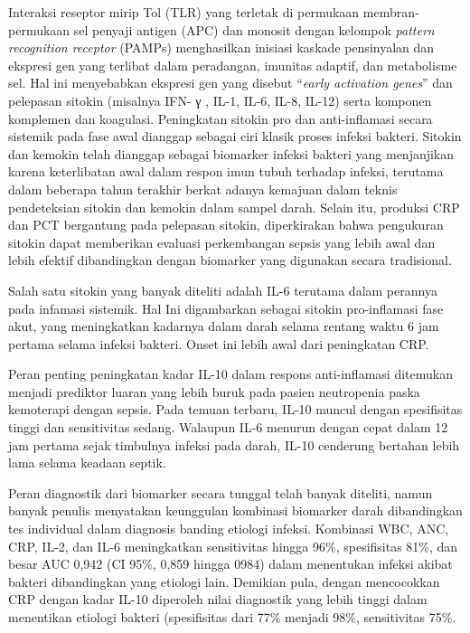 \documentclass[
  10pt,
  letterpaper,
]{article}
\begin{document}
Interaksi reseptor mirip Tol (TLR) yang terletak di permukaan membran­
permukaan sel penyaji antigen (APC) dan monosit dengan kelompok
\emph{pattern recognition receptor} (PAMPs) menghasilkan inisiasi
kaskade pensinyalan dan ekspresi gen yang terlibat dalam peradangan,
imunitas adaptif, dan metabolisme sel. Hal ini menyebabkan ekspresi gen
yang disebut ``\emph{early activation genes}'' dan pelepasan sitokin
(misalnya IFN- γ , IL-1, IL-6, IL-8, IL-12) serta komponen komplemen dan
koagulasi.\citep{Jarczak2021} Peningkatan sitokin pro dan anti-inflamasi
secara sistemik pada fase awal dianggap sebagai ciri klasik proses
infeksi bakteri. Sitokin dan kemokin telah dianggap sebagai biomarker
infeksi bakteri yang menjanjikan karena keterlibatan awal dalam respon
imun tubuh terhadap infeksi, terutama dalam beberapa tahun terakhir
berkat adanya kemajuan dalam teknis pendeteksian sitokin dan kemokin
dalam sampel darah. Selain itu, produksi CRP dan PCT bergantung pada
pelepasan sitokin, diperkirakan bahwa pengukuran sitokin dapat
memberikan evaluasi perkembangan sepsis yang lebih awal dan lebih
efektif dibandingkan dengan biomarker yang digunakan secara
tradisional.\citep{Boscarino2023}

Salah satu sitokin yang banyak diteliti adalah IL-6 terutama dalam
perannya pada infamasi sistemik. Hal Ini digambarkan sebagai sitokin
pro-inflamasi fase akut, yang meningkatkan kadarnya dalam darah selama
rentang waktu 6 jam pertama selama infeksi bakteri. Onset ini lebih awal
dari peningkatan CRP.\citep{Barichello2022, Biron2015}

Peran penting peningkatan kadar IL-10 dalam respons anti-inflamasi
ditemukan menjadi prediktor luaran yang lebih buruk pada pasien
neutropenia paska kemoterapi dengan sepsis. Pada temuan terbaru, IL-10
muncul dengan spesifisitas tinggi dan sensitivitas sedang. Walaupun IL-6
menurun dengan cepat dalam 12 jam pertama sejak timbulnya infeksi pada
darah, IL-10 cenderung bertahan lebih lama selama keadaan
septik.\citep{bernardi2024}

Peran diagnostik dari biomarker secara tunggal telah banyak diteliti,
namun banyak penulis menyatakan keunggulan kombinasi biomarker darah
dibandingkan tes individual dalam diagnosis banding etiologi
infeksi.\citep{theodosiou2019, tamelyte2019} Kombinasi WBC, ANC, CRP,
IL-2, dan IL-6 meningkatkan sensitivitas hingga 96\%, spesifisitas 81\%,
dan besar AUC 0,942 (CI 95\%, 0,859 hingga 0984) dalam menentukan
infeksi akibat bakteri dibandingkan yang etiologi lain.\citep{zeng2022}
Demikian pula, dengan mencocokkan CRP dengan kadar IL-10 diperoleh nilai
diagnostik yang lebih tinggi dalam menentikan etiologi bakteri
(spesifisitas dari 77\% menjadi 98\%, sensitivitas
75\%.\citep{bernardi2024}
\end{document}
